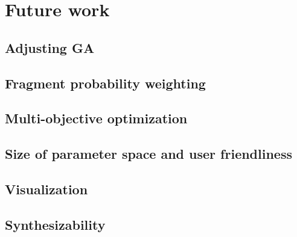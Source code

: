 \chapter*{Future work}
\section*{Adjusting GA}
\section*{Fragment probability weighting} %
\section*{Multi-objective optimization}
\section*{Size of parameter space and user friendliness}
\section*{Visualization}
\section*{Synthesizability}
